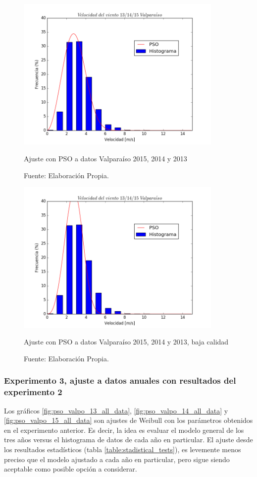 \begin{figure}[H]
    \centering
    \includegraphics[height=75mm]{figures/result_13-14-15.png}
    \caption{Ajuste con PSO a datos Valparaíso 2015, 2014 y 2013}
    \vspace{-.25cm}
    \caption*{Fuente: Elaboración Propia.}
    \label{fig:pso_valpo_15_14_13}
\end{figure}
\begin{figure}[H]
    \centering
    \includegraphics[height=75mm]{figures/result_13-14-15_low_quality.png}
    \caption{Ajuste con PSO a datos Valparaíso 2015, 2014 y 2013, baja calidad}
    \vspace{-.25cm}
    \caption*{Fuente: Elaboración Propia.}
    \label{fig:pso_valpo_15_14_13_lq}
\end{figure}

\subsubsection{Experimento 3, ajuste a datos anuales con resultados del experimento 2}
Los gráficos \ref{fig:pso_valpo_13_all_data}, \ref{fig:pso_valpo_14_all_data} y \ref{fig:pso_valpo_15_all_data} son ajustes de Weibull con los parámetros obtenidos en el experimento anterior. Es decir, la idea es evaluar el modelo general de los tres años versus el histograma de datos de cada año en particular.
El ajuste desde los resultados estadísticos (tabla \ref{table:stadistical_tests}), es levemente menos preciso que el modelo ajustado a cada año en particular, pero sigue siendo aceptable como posible opción a considerar.

